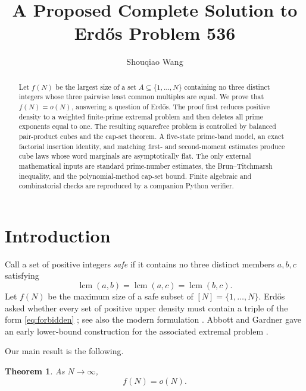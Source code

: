 \documentclass[11pt]{article}
\title{
A Proposed Complete Solution to Erd\H{o}s Problem 536
}
\author{Shouqiao Wang}
\affil{Columbia University\hspace{2.5em}Multiscalar Intelligence}
\date{}
\numberwithin{equation}{section}
\theoremstyle{plain}
\newtheorem{theorem}{Theorem}[section]
\newcommand{\1}{\mathbf 1}
\newcommand{\lcm}{\operatorname{lcm}}
\begin{document}
\maketitle

\begin{abstract}
Let $f(N)$ be the largest size of a set $A\subseteq\{1,\ldots,N\}$
containing no three distinct integers whose three pairwise least common
multiples are equal.  We prove that $f(N)=o(N)$, answering a question of
Erd\H{o}s.  The proof first reduces positive density to a weighted
finite-prime extremal problem and then deletes all prime exponents equal to
one.  The resulting squarefree problem is controlled by balanced
pair-product cubes and the cap-set theorem.  A five-state prime-band model,
an exact factorial insertion identity, and matching first- and second-moment
estimates produce cube laws whose word marginals are asymptotically flat.
The only external mathematical inputs are standard prime-number estimates,
the Brun--Titchmarsh inequality, and the polynomial-method cap-set bound.
Finite algebraic and combinatorial checks are reproduced by a companion
Python verifier.
\end{abstract}

\section{Introduction}\label{sec:introduction}

Call a set of positive integers \emph{safe} if it contains no three
distinct members $a,b,c$ satisfying
\begin{equation}\label{eq:forbidden}
 \lcm(a,b)=\lcm(a,c)=\lcm(b,c).
\end{equation}
Let $f(N)$ be the maximum size of a safe subset of $[N]=\{1,\ldots,N\}$.
Erd\H{o}s asked whether every set of positive upper density must contain a
triple of the form \eqref{eq:forbidden} \cite[p.~646]{Erdos1964}; see also
the modern formulation \cite{Bloom536}.  Abbott and Gardner gave an early
lower-bound construction for the associated extremal problem
\cite{AbbottGardner}.

Our main result is the following.

\begin{theorem}\label{thm:main}
As $N\to\infty$,
\[
 f(N)=o(N).
\]
\end{theorem}
\end{document}
